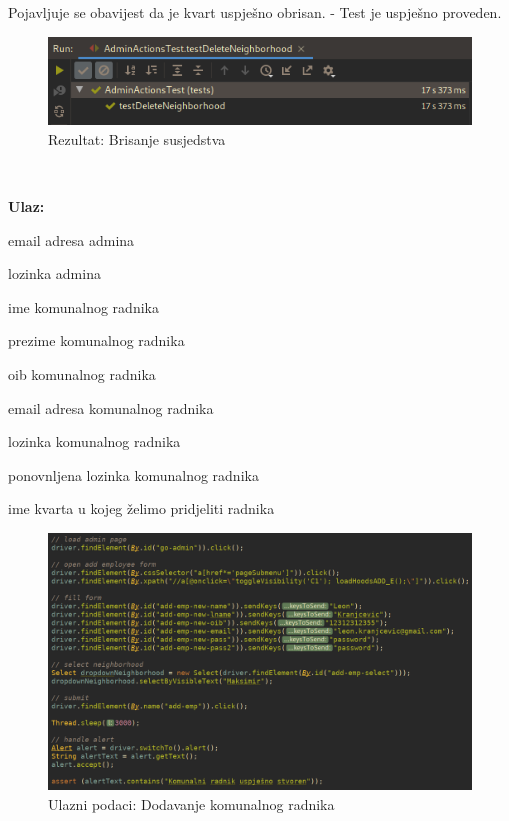 		
			Pojavljuje se obavijest da je kvart uspješno obrisan. - Test je uspješno proveden.	


				\begin{figure}[H]
					\includegraphics[scale=0.57]{figures/admin-delete-neighborhood-pass.PNG}
					\centering
					\caption{Rezultat: Brisanje susjedstva}
					\label{fig:Brisanje susjedstva}
				\end{figure}

			
			
			\noindent {}
			
			\
			
			\noindent \textbf{Ulaz:}
			
			\begin{packed_enum}
				\item email adresa admina
				\item lozinka admina
				\item ime komunalnog radnika
				\item prezime komunalnog radnika	
				\item oib komunalnog radnika		
				\item email adresa komunalnog radnika
				\item lozinka komunalnog radnika
				\item ponovnljena lozinka komunalnog radnika
				\item ime kvarta u kojeg želimo pridjeliti radnika
				
			\end{packed_enum}

			\begin{figure}[H]
					\includegraphics[scale=0.57]{figures/admin-add-emp-code.PNG}
					\centering
					\caption{Ulazni podaci: Dodavanje komunalnog radnika}
					\label{fig:Dodavanje komunalnog radnika}
				\end{figure}	
			
